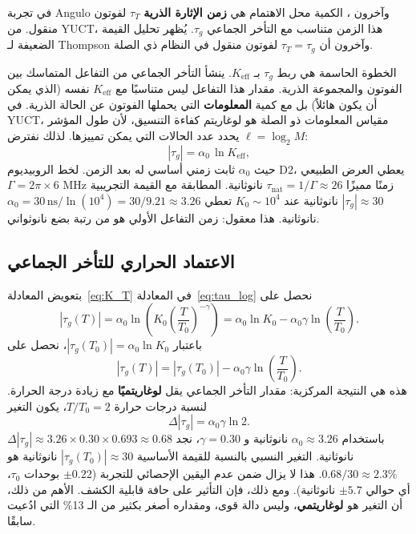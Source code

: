 \documentclass[12pt,a4paper]{article}
\newcommand{\Keff}{K_{\mathrm{eff}}}
\begin{document}
	في تجربة Angulo وآخرون \cite{Angulo2024}، الكمية محل الاهتمام هي \textbf{زمن الإثارة الذرية} \(\tau_T\) لفوتون منقول. من YUCT، هذا الزمن متناسب مع التأخر الجماعي \(\tau_g\). يُظهر تحليل القيمة الضعيفة لـ Thompson وآخرون \cite{Thompson2023} أن \(\tau_T = \tau_g\) لفوتون منقول في النظام ذي الصلة.
	
	الخطوة الحاسمة هي ربط \(\tau_g\) بـ \(\Keff\). ينشأ التأخر الجماعي من التفاعل المتماسك بين الفوتون والمجموعة الذرية. مقدار هذا التفاعل ليس متناسبًا مع \(\Keff\) نفسه (الذي يمكن أن يكون هائلاً) بل مع كمية \textbf{المعلومات} التي يحملها الفوتون عن الحالة الذرية. في YUCT، مقياس المعلومات ذو الصلة هو لوغاريتم كفاءة التنسيق، لأن طول المؤشر \(\ell = \log_2 M\) يحدد عدد الحالات التي يمكن تمييزها. لذلك نفترض:
	\begin{equation}
		|\tau_g| = \alpha_0 \, \ln\Keff,
		\label{eq:tau_log}
	\end{equation}
	حيث \(\alpha_0\) ثابت زمني أساسي له بعد الزمن. لخط الروبيديوم D2، يعطي العرض الطبيعي \(\Gamma = 2\pi \times 6\) MHz زمنًا مميزًا \(\tau_{\text{nat}} = 1/\Gamma \approx 26\) نانوثانية. المطابقة مع القيمة التجريبية \(|\tau_g| \approx 30\) نانوثانية عند \(K_0 \sim 10^4\) تعطي \(\alpha_0 = 30\,\text{ns} / \ln(10^4) = 30 / 9.21 \approx 3.26\) نانوثانية. هذا معقول: زمن التفاعل الأولي هو من رتبة بضع نانوثواني.
	
	\subsection{الاعتماد الحراري للتأخر الجماعي}
	
	بتعويض المعادلة~\eqref{eq:K_T} في المعادلة~\eqref{eq:tau_log} نحصل على
	\begin{equation}
		|\tau_g(T)| = \alpha_0 \ln\!\left(K_0 \left(\frac{T}{T_0}\right)^{-\gamma}\right)
		= \alpha_0 \ln K_0 - \alpha_0 \gamma \ln\!\left(\frac{T}{T_0}\right).
	\end{equation}
	باعتبار \(|\tau_g(T_0)| = \alpha_0 \ln K_0\)، نحصل على
	\begin{equation}
		|\tau_g(T)| = |\tau_g(T_0)| - \alpha_0 \gamma \ln\!\left(\frac{T}{T_0}\right).
		\label{eq:tau_T_log}
	\end{equation}
	هذه هي النتيجة المركزية: مقدار التأخر الجماعي يقل \textbf{لوغاريتميًا} مع زيادة درجة الحرارة. لنسبة درجات حرارة \(T/T_0 = 2\)، يكون التغير
	\begin{equation}
		\Delta |\tau_g| = \alpha_0 \gamma \ln 2.
	\end{equation}
	باستخدام \(\alpha_0 \approx 3.26\) نانوثانية و \(\gamma = 0.30\)، نجد \(\Delta |\tau_g| \approx 3.26 \times 0.30 \times 0.693 \approx 0.68\) نانوثانية. التغير النسبي بالنسبة للقيمة الأساسية \(|\tau_g(T_0)| \approx 30\) نانوثانية هو \(0.68 / 30 \approx 2.3\%\). هذا لا يزال ضمن عدم اليقين الإحصائي للتجربة (\(\pm 0.22\) بوحدات \(\tau_0\)، أي حوالي \(\pm 5.7\) نانوثانية). ومع ذلك، فإن التأثير على حافة قابلية الكشف. الأهم من ذلك، أن التغير هو \textbf{لوغاريتمي}، وليس دالة قوى، ومقداره أصغر بكثير من الـ 13\% التي ادُعيت سابقًا.
	
\end{document}
